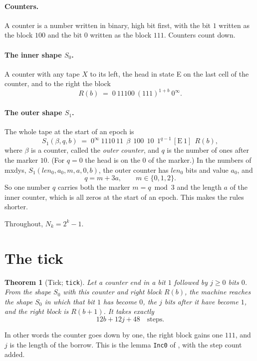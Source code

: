 \documentclass[11pt]{article}
\newtheorem{theorem}{Theorem}
\theoremstyle{remark}
\newcommand{\st}[1]{\mathrm{#1}}
\newcommand{\inftyl}{0^{\infty}}
\newcommand{\coq}[1]{\texttt{#1}}
\begin{document}
\paragraph{Counters.} A counter is a number written in binary, high bit first,
with the bit $1$ written as the block $100$ and the bit $0$ written as the
block $111$. Counters count down.

\paragraph{The inner shape $S_0$.} A counter with any tape $X$ to its left, the
head in state E on the last cell of the counter, and to the right the block
\[
R(b) \;=\; 0\ 11100\ (111)^{1+b}\ \inftyl .
\]

\paragraph{The outer shape $S_1$.} The whole tape at the start of an epoch is
\[
S_1(\beta, q, b) \;=\; \inftyl\ 1110\,11\ \ \beta\ \ 100\ \ 10\ \ 1^{q-1}\,[\st{E}\ 1]\ \ R(b),
\]
where $\beta$ is a counter, called the \emph{outer counter}, and $q$ is the
number of ones after the marker $10$. (For $q=0$ the head is on the $0$ of the
marker.) In the numbers of mxdys, $S_1(\mathit{len}_0,a_0,m,a,0,b)$, the outer
counter has $\mathit{len}_0$ bits and value $a_0$, and
\[
q = m + 3a, \qquad m\in\{0,1,2\}.
\]
So one number $q$ carries both the marker $m = q \bmod 3$ and the length $a$ of
the inner counter, which is all zeros at the start of an epoch. This makes the
rules shorter.

Throughout, $N_k = 2^{k}-1$.

\section{The tick}

\begin{theorem}[Tick; \coq{tick}]\label{thm:tick}
Let a counter end in a bit $1$ followed by $j \ge 0$ bits $0$. From the shape
$S_0$ with this counter and right block $R(b)$, the machine reaches the shape
$S_0$ in which that bit $1$ has become $0$, the $j$ bits after it have become
$1$, and the right block is $R(b+1)$. It takes exactly
\[
12b + 12j + 48 \quad \text{steps.}
\]
\end{theorem}

In other words the counter goes down by one, the right block gains one $111$,
and $j$ is the length of the borrow. This is the lemma \coq{Inc0} of
\cite{mxdys}, with the step count added.
\end{document}
